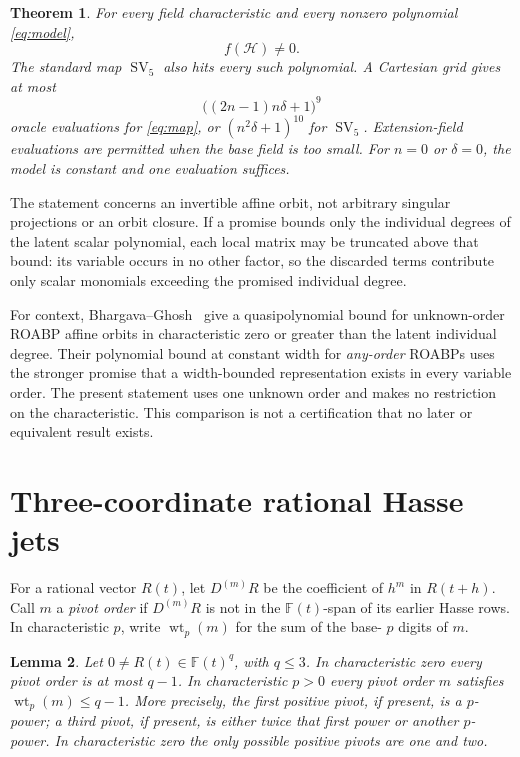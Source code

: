 \documentclass[11pt]{article}
\newtheorem{theorem}{Theorem}[section]
\newtheorem{lemma}[theorem]{Lemma}
\newcommand{\F}{\mathbb F}
\newcommand{\SV}{\operatorname{SV}}
\newcommand{\wt}{\operatorname{wt}}
\begin{document}
\begin{theorem}\label{thm:main}
For every field characteristic and every nonzero polynomial
\eqref{eq:model},
\[
 f(\mathcal H)\ne0.
\]
The standard map \(\SV_5\) also hits every such polynomial. A Cartesian
grid gives at most
\[
 \bigl((2n-1)n\delta+1\bigr)^9
\]
oracle evaluations for \eqref{eq:map}, or \((n^2\delta+1)^{10}\) for
\(\SV_5\). Extension-field evaluations are permitted when the base
field is too small. For \(n=0\) or \(\delta=0\), the model is constant
and one evaluation suffices.
\end{theorem}

The statement concerns an invertible affine orbit, not arbitrary singular
projections or an orbit closure. If a promise bounds only the individual
degrees of the latent scalar polynomial, each local matrix may be
truncated above that bound: its variable occurs in no other factor, so
the discarded terms contribute only scalar monomials exceeding the
promised individual degree.

For context, Bhargava--Ghosh~\cite{BG} give a quasipolynomial bound for
unknown-order ROABP affine orbits in characteristic zero or greater than
the latent individual degree. Their polynomial bound at constant width
for \emph{any-order} ROABPs uses the stronger promise that a width-bounded
representation exists in every variable order. The present statement
uses one unknown order and makes no restriction on the characteristic.
This comparison is not a certification that no later or equivalent
result exists.

\section{Three-coordinate rational Hasse jets}

For a rational vector \(R(t)\), let \(D^{(m)}R\) be the coefficient
of \(h^m\) in \(R(t+h)\). Call \(m\) a \emph{pivot order} if
\(D^{(m)}R\) is not in the \(\F(t)\)-span of its earlier Hasse rows.
In characteristic \(p\), write \(\wt_p(m)\) for the sum of the base-
\(p\) digits of \(m\).

\begin{lemma}\label{lem:jets}
Let \(0\ne R(t)\in\F(t)^q\), with \(q\le3\). In characteristic
zero every pivot order is at most \(q-1\). In characteristic \(p>0\)
every pivot order \(m\) satisfies \(\wt_p(m)\le q-1\).
More precisely, the first positive pivot, if present, is a \(p\)-power;
a third pivot, if present, is either twice that first power or another
\(p\)-power. In characteristic zero the only possible positive pivots
are one and two.
\end{lemma}
\end{document}
